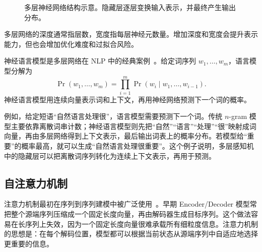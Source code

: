 
\begin{figure}[htbp]
  \centering
  
  \caption{多层神经网络结构示意。隐藏层逐层变换输入表示，并最终产生输出分布。}
  \label{fig:nlpbook-multi-layer-network}
\end{figure}

多层网络的深度通常指层数，宽度指每层神经元数量。增加深度和宽度会提升表示能力，但也会增加优化难度和过拟合风险。

神经语言模型是多层网络在 NLP 中的经典案例~\cite{bengio-etal:2000neural,BengioEtAl2003NeuralLM}。给定词序列 $w_1,\ldots,w_m$，语言模型分解为
\begin{equation}
  \Pr(w_1,\ldots,w_m)
  =
  \prod_{i=1}^{m}
  \Pr(w_i\mid w_1,\ldots,w_{i-1}).
\end{equation}
神经语言模型用连续向量表示词和上下文，再用神经网络预测下一个词的概率。

例如，给定短语“自然语言处理很”，语言模型需要预测下一个词。传统 $n$-gram 模型主要依靠离散词串计数；神经语言模型则先把“自然”“语言”“处理”“很”映射成词向量，再由多层网络得到上下文表示，最后输出词表上的概率分布。若模型给“重要”的概率最高，就可以生成“自然语言处理很重要”。这个例子说明，多层感知机中的隐藏层可以把离散词序列转化为连续上下文表示，再用于预测。

\subsection{自注意力机制}

注意力机制最初在序列到序列建模中被广泛使用~\cite{BahdanauEtAl2015Attention}。早期 Encoder/Decoder 模型常把整个源端序列压缩成一个固定长度向量，再由解码器生成目标序列。这个做法容易在长序列上失效，因为一个固定长度向量很难承载所有细粒度信息。注意力机制的思想是：在每个解码位置，模型都可以根据当前状态从源端序列中自适应地选择更重要的信息。

